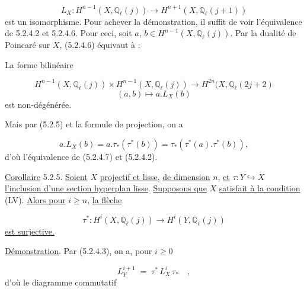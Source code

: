\begin{equation}\tag{5.2.4.6}
L_X : H^{n-1}(X,\mathbb{Q}_\ell(j)) \longrightarrow H^{n+1}(X,\mathbb{Q}_\ell(j+1))
\end{equation}
est un isomorphisme. Pour achever la démonstration, il suffit de voir l'équivalence de 5.2.4.2 et 5.2.4.6. Pour ceci, soit $a$, $b \in H^{n-1}(X,\mathbb{Q}_\ell(j))$. Par la dualité de Poincaré sur $X$, (5.2.4.6) équivaut à :

La forme bilinéaire

\begin{equation*}
H^{n-1}(X,\mathbb{Q}_\ell(j))\times H^{n-1}(X,\mathbb{Q}_\ell(j)) \longrightarrow H^{2n}(X,\mathbb{Q}_\ell(2j+2)
\end{equation*}
\begin{equation*}
(a,b) \longmapsto a.L_X(b)
\end{equation*}
est non-dégénérée.



Mais par (5.2.5) et la formule de projection, on a

\begin{equation*}
a.L_X(b) = a.\tau_*(\tau^*(b)) = \tau_*(\tau^*(a).\tau^*(b)),
\end{equation*}
d'où l'équivalence de (5.2.4.7) et (5.2.4.2).

\underline{Corollaire} 5.2.5. \underline{Soient} $X$ \underline{projectif et lisse}, \underline{de dimension} $n$, \underline{et} $\tau : Y \hookrightarrow X$ \underline{l'inclusion d'une section hyperplan lisse}. \underline{Supposons que} $X$ \underline{satisfait à la condition} (LV). \underline{Alors pour} $i \geq n$, \underline{la flèche}

\begin{equation*}
\tau^* : H^i(X,\mathbb{Q}_\ell(j)) \longrightarrow H^i(Y,\mathbb{Q}_\ell(j))
\end{equation*}
\underline{est surjective.}

\underline{Démonstration}. Par (5.2.4.3), on a, pour $i \geq 0$

\begin{equation*}
L_Y^{i+1} \;=\; \tau^* \, L_X^i \, \tau_* \quad ,
\end{equation*}
d'où le diagramme commutatif

